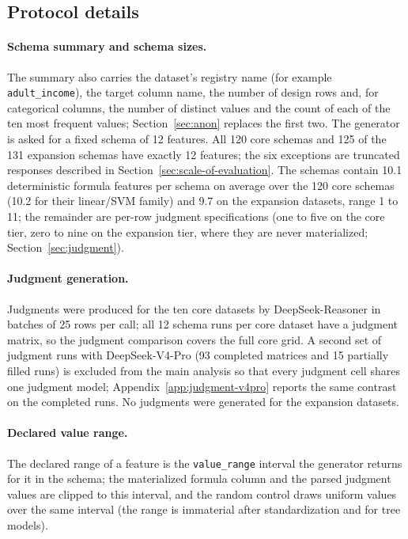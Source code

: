 \subsection*{Protocol details}

\paragraph{Schema summary and schema sizes.}

The summary also carries the dataset's registry name (for example \texttt{adult\_income}), the target column name, the number of design rows and, for categorical columns, the number of distinct values and the count of each of the ten most frequent values; Section~\ref{sec:anon} replaces the first two. The generator is asked for a fixed schema of 12 features. All 120 core schemas and 125 of the 131 expansion schemas have exactly 12 features; the six exceptions are truncated responses described in Section~\ref{sec:scale-of-evaluation}. The schemas contain 10.1 deterministic formula features per schema on average over the 120 core schemas (10.2 for their linear/SVM family) and 9.7 on the expansion datasets, range 1 to 11; the remainder are per-row judgment specifications (one to five on the core tier, zero to nine on the expansion tier, where they are never materialized; Section~\ref{sec:judgment}).

\paragraph{Judgment generation.}

Judgments were produced for the ten core datasets by DeepSeek-Reasoner in batches of 25 rows per call; all 12 schema runs per core dataset have a judgment matrix, so the judgment comparison covers the full core grid. A second set of judgment runs with DeepSeek-V4-Pro (93 completed matrices and 15 partially filled runs) is excluded from the main analysis so that every judgment cell shares one judgment model; Appendix~\ref{app:judgment-v4pro} reports the same contrast on the completed runs. No judgments were generated for the expansion datasets.

\paragraph{Declared value range.}

The declared range of a feature is the \texttt{value\_range} interval the generator returns for it in the schema; the materialized formula column and the parsed judgment values are clipped to this interval, and the random control draws uniform values over the same interval (the range is immaterial after standardization and for tree models).

